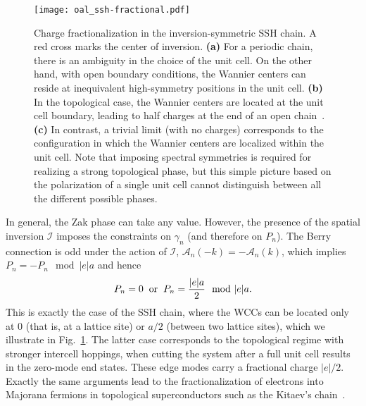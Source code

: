 \begin{figure}[H]
\centering
\texttt{[image: oal\_ssh-fractional.pdf]}
\caption[Charge fractionalization in the inversion-symmetric SSH chain]{Charge fractionalization in the inversion-symmetric SSH chain. A red cross marks the center of inversion. \textbf{(a)} For a periodic chain, there is an ambiguity in the choice of the unit cell. On the other hand, with open boundary conditions, the Wannier centers can reside at inequivalent high-symmetry positions in the unit cell. \textbf{(b)} In the topological case, the Wannier centers are located at the unit cell boundary, leading to half charges at the end of an open chain~\cite{Miert16,miertOrtixFractionalCharge17,rhim17}. \textbf{(c)} In contrast, a trivial limit (with no charges) corresponds to the configuration in which the Wannier centers are localized within the unit cell. Note that imposing spectral symmetries is required for realizing a strong topological phase, but this simple picture based on the polarization of a single unit cell cannot distinguish between all the different possible phases.}
\label{fig:ssh-charge}
\end{figure}

In general, the Zak phase can take any value. However, the presence of the spatial inversion $\mathcal{I}$ imposes the constraints on $\gamma_n$ (and therefore on $P_n$). The Berry connection is odd under the action of $\mathcal{I}$, $\bm{\mathcal{A}}_n (-k)  =  -\bm{\mathcal{A}}_n (k)$, which implies $P_n = -P_n \mod |e| a $ and hence
\begin{equation}
P_n =0 \hspace*{0.2cm} \mathrm{or} \hspace*{0.2cm}  P_n = \frac{|e | a}{2} \mod |e| a .
\end{equation}
This is exactly the case of the SSH chain, where the WCCs can be located only at $0$ (that is, at a lattice site) or $a /2$ (between two lattice sites), which we illustrate in Fig.~\ref{fig:ssh-charge}. The latter case corresponds to the topological regime with stronger intercell hoppings, when cutting the system after a full unit cell results in the zero-mode end states. These edge modes carry a fractional charge $|e| /2$. Exactly the same arguments lead to the fractionalization of electrons into Majorana fermions in topological superconductors such as the Kitaev's chain~\cite{Kitaev_2001}.

